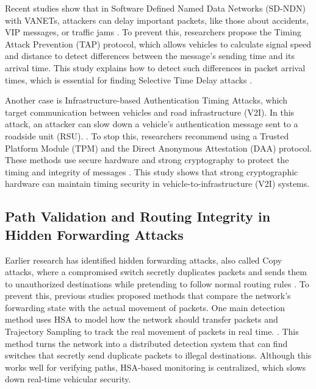 \documentclass[12pt, a4paper]{report}
\begin{document}
Recent studies show that in Software Defined Named Data Networks (SD-NDN) with VANETs, attackers can delay important packets, like those about accidents, VIP messages, or traffic jams \cite{8616999}. To prevent this, researchers propose the Timing Attack Prevention (TAP) protocol, which allows vehicles to calculate signal speed and distance to detect differences between the message's sending time and its arrival time. This study explains how to detect such differences in packet arrival times, which is essential for finding Selective Time Delay attacks \cite{8616999}.

Another case is Infrastructure-based Authentication Timing Attacks, which target communication between vehicles and road infrastructure (V2I). In this attack, an attacker can slow down a vehicle's authentication message sent to a roadside unit (RSU). \cite{Timing_Attack}. To stop this, researchers recommend using a Trusted Platform Module (TPM) and the Direct Anonymous Attestation (DAA) protocol. These methods use secure hardware and strong cryptography to protect the timing and integrity of messages \cite{Timing_Attack}. This study shows that strong cryptographic hardware can maintain timing security in vehicle-to-infrastructure (V2I) systems.

\subsection{Path Validation and Routing Integrity in Hidden Forwarding Attacks}

Earlier research has identified hidden forwarding attacks, also called Copy attacks, where a compromised switch secretly duplicates packets and sends them to unauthorized destinations while pretending to follow normal routing rules \cite{bu2020unveiling} \cite{mohammadi2016detecting}. To prevent this, previous studies proposed methods that compare the network's forwarding state with the actual movement of packets. One main detection method uses HSA to model how the network should transfer packets and Trajectory Sampling to track the real movement of packets in real time. \cite{mohammadi2016detecting}. This method turns the network into a distributed detection system that can find switches that secretly send duplicate packets to illegal destinations. Although this works well for verifying paths, HSA-based monitoring is centralized, which slows down real-time vehicular security.
\end{document}
